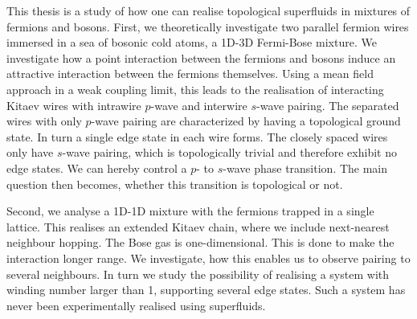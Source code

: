 \newpage
This thesis is a study of how one can realise topological superfluids in mixtures of fermions and bosons. First, we theoretically investigate two parallel fermion wires immersed in a sea of bosonic cold atoms, a 1D-3D Fermi-Bose mixture. We investigate how a point interaction between the fermions and bosons induce an attractive interaction between the fermions themselves. Using a mean field approach in a weak coupling limit, this leads to the realisation of interacting Kitaev wires with intrawire $p$-wave and interwire $s$-wave pairing. The separated wires with only $p$-wave pairing are characterized by having a topological ground state. In turn a single edge state in each wire forms. The closely spaced wires only have $s$-wave pairing, which is topologically trivial and therefore exhibit no edge states. We can hereby control a $p$- to $s$-wave phase transition. The main question then becomes, whether this transition is topological or not. 

Second, we analyse a 1D-1D mixture with the fermions trapped in a single lattice. This realises an extended Kitaev chain, where we include next-nearest neighbour hopping. The Bose gas is one-dimensional. This is done to make the interaction longer range. We investigate, how this enables us to observe pairing to several neighbours. In turn we study the possibility of realising a system with winding number larger than 1, supporting several edge states. Such a system has never been experimentally realised using superfluids. 
